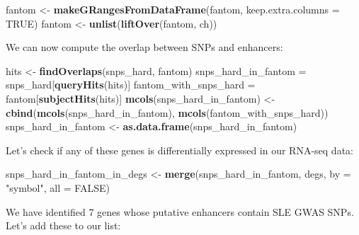 \documentclass[9pt,a4paper,]{extarticle}
\newenvironment{Shaded}{\begin{snugshade}}{\end{snugshade}}
\newcommand{\KeywordTok}[1]{\textcolor[rgb]{0.13,0.29,0.53}{\textbf{#1}}}
\newcommand{\DataTypeTok}[1]{\textcolor[rgb]{0.13,0.29,0.53}{#1}}
\newcommand{\StringTok}[1]{\textcolor[rgb]{0.31,0.60,0.02}{#1}}
\newcommand{\OtherTok}[1]{\textcolor[rgb]{0.56,0.35,0.01}{#1}}
\newcommand{\NormalTok}[1]{#1}
\theoremstyle{definition}
\theoremstyle{definition}
\theoremstyle{definition}
\theoremstyle{remark}
\begin{document}
\begin{Shaded}
\begin{Highlighting}[]
\NormalTok{fantom <-}\StringTok{ }\KeywordTok{makeGRangesFromDataFrame}\NormalTok{(fantom, }\DataTypeTok{keep.extra.columns =} \OtherTok{TRUE}\NormalTok{)}
\NormalTok{fantom <-}\StringTok{ }\KeywordTok{unlist}\NormalTok{(}\KeywordTok{liftOver}\NormalTok{(fantom, ch))}
\end{Highlighting}
\end{Shaded}

We can now compute the overlap between SNPs and enhancers:

\begin{Shaded}
\begin{Highlighting}[]
\NormalTok{hits <-}\StringTok{ }\KeywordTok{findOverlaps}\NormalTok{(snps_hard, fantom)}
\NormalTok{snps_hard_in_fantom =}\StringTok{ }\NormalTok{snps_hard[}\KeywordTok{queryHits}\NormalTok{(hits)]}
\NormalTok{fantom_with_snps_hard =}\StringTok{ }\NormalTok{fantom[}\KeywordTok{subjectHits}\NormalTok{(hits)]}
\KeywordTok{mcols}\NormalTok{(snps_hard_in_fantom) <-}\StringTok{ }\KeywordTok{cbind}\NormalTok{(}\KeywordTok{mcols}\NormalTok{(snps_hard_in_fantom), }\KeywordTok{mcols}\NormalTok{(fantom_with_snps_hard))}
\NormalTok{snps_hard_in_fantom <-}\StringTok{ }\KeywordTok{as.data.frame}\NormalTok{(snps_hard_in_fantom)}
\end{Highlighting}
\end{Shaded}

Let's check if any of these genes is differentially expressed in our RNA-seq data:

\begin{Shaded}
\begin{Highlighting}[]
\NormalTok{snps_hard_in_fantom_in_degs <-}\StringTok{ }\KeywordTok{merge}\NormalTok{(snps_hard_in_fantom, degs, }\DataTypeTok{by =} \StringTok{"symbol"}\NormalTok{, }\DataTypeTok{all =} \OtherTok{FALSE}\NormalTok{)}
\end{Highlighting}
\end{Shaded}

We have identified 7 genes whose putative enhancers contain SLE GWAS SNPs.
Let's add these to our list:
\end{document}
